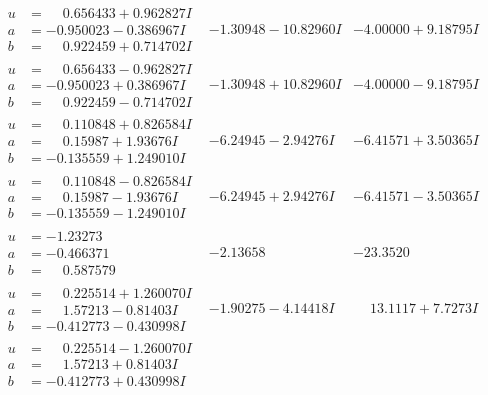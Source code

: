 \documentclass[1p]{elsarticle_modified}
\theoremstyle{definition}
\begin{document}
$$\begin{array}{c|c|c}
\begin{aligned}
u &= \phantom{-}0.656433 + 0.962827 I \\
a &= -0.950023 - 0.386967 I \\
b &= \phantom{-}0.922459 + 0.714702 I\end{aligned}
 & -1.30948 - 10.82960 I & -4.00000 + 9.18795 I \\ \hline\begin{aligned}
u &= \phantom{-}0.656433 - 0.962827 I \\
a &= -0.950023 + 0.386967 I \\
b &= \phantom{-}0.922459 - 0.714702 I\end{aligned}
 & -1.30948 + 10.82960 I & -4.00000 - 9.18795 I \\ \hline\begin{aligned}
u &= \phantom{-}0.110848 + 0.826584 I \\
a &= \phantom{-}0.15987 + 1.93676 I \\
b &= -0.135559 + 1.249010 I\end{aligned}
 & -6.24945 - 2.94276 I & -6.41571 + 3.50365 I \\ \hline\begin{aligned}
u &= \phantom{-}0.110848 - 0.826584 I \\
a &= \phantom{-}0.15987 - 1.93676 I \\
b &= -0.135559 - 1.249010 I\end{aligned}
 & -6.24945 + 2.94276 I & -6.41571 - 3.50365 I \\ \hline\begin{aligned}
u &= -1.23273\phantom{ +0.000000I} \\
a &= -0.466371\phantom{ +0.000000I} \\
b &= \phantom{-}0.587579\phantom{ +0.000000I}\end{aligned}
 & -2.13658\phantom{ +0.000000I} & -23.3520\phantom{ +0.000000I} \\ \hline\begin{aligned}
u &= \phantom{-}0.225514 + 1.260070 I \\
a &= \phantom{-}1.57213 - 0.81403 I \\
b &= -0.412773 - 0.430998 I\end{aligned}
 & -1.90275 - 4.14418 I & \phantom{-}13.1117 + 7.7273 I \\ \hline\begin{aligned}
u &= \phantom{-}0.225514 - 1.260070 I \\
a &= \phantom{-}1.57213 + 0.81403 I \\
b &= -0.412773 + 0.430998 I\end{aligned}

\end{array}$$
\end{document}

